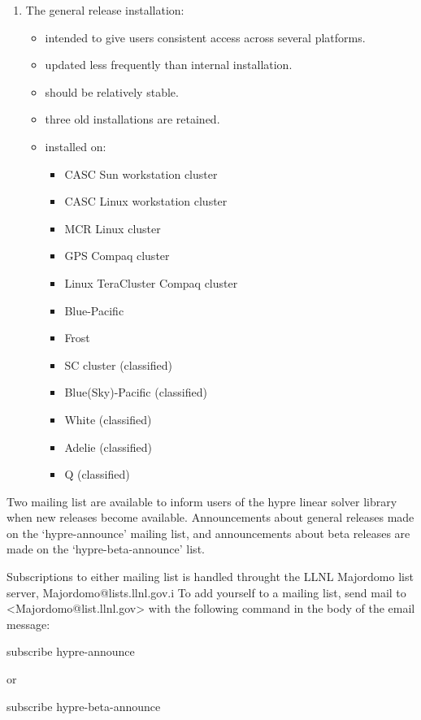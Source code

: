 \begin{enumerate}
\item The general release installation:
   \begin{itemize}
   \item intended to give users consistent access across several platforms.
   \item updated less frequently than internal installation.
   \item should be relatively stable.
   \item three old installations are retained.
   \item installed on:
      \begin{itemize}
       \item CASC Sun workstation cluster
       \item CASC Linux workstation cluster
       \item MCR Linux cluster
       \item GPS Compaq cluster
       \item Linux TeraCluster Compaq cluster
       \item Blue-Pacific
       \item Frost
       \item SC cluster          (classified)
       \item Blue(Sky)-Pacific   (classified)
       \item White               (classified)
       \item Adelie              (classified)
       \item Q                   (classified)
      \end{itemize}
   \end{itemize}

\end{enumerate}

Two mailing list are available to inform users of the hypre
linear solver library when new releases become available.
Announcements about general releases made on the `hypre-announce'
mailing list, and announcements about beta releases are made on the
`hypre-beta-announce' list. 

Subscriptions to either mailing list is handled throught the LLNL
Majordomo list server, Majordomo@lists.llnl.gov.i To add yourself
to a mailing list, send mail to <Majordomo@list.llnl.gov> with
the following command in the body of the email message:

 subscribe hypre-announce

or

 subscribe hypre-beta-announce

